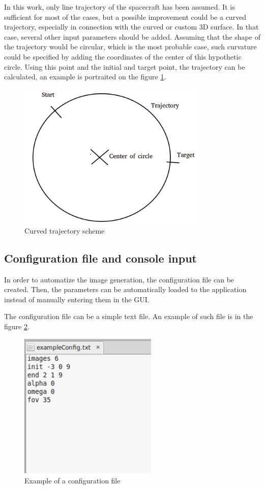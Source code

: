 \documentclass[english,12pt,a4paper,pdftex,elec,utf8]{aaltothesis}
\begin{document}
In this work, only line trajectory of the spacecraft has been assumed. It is sufficient for most of the cases, but a possible improvement could be a curved trajectory, especially in connection with the curved or custom 3D surface. In that case, several other input parameters should be added. Assuming that the shape of the trajectory would be circular, which is the most probable case, such curvature could be specified by adding the coordinates of the center of this hypothetic circle. Using this point and the initial and target point, the trajectory can be calculated, an example is portraited on the figure \ref{CurvedTrajectory}.

\begin{figure}[htb]
\centering \includegraphics[height=7cm]{CurvedTrajectory.png}
\caption{Curved trajectory scheme\label{CurvedTrajectory}}
\end{figure}

\subsection*{Configuration file and console input} 

In order to automatize the image generation, the configuration file can be created. Then, the parameters can be automatically loaded to the application instead of manually entering them in the GUI.

The configuration file can be a simple text file. An example of such file is in the figure \ref{exampleConfig}.

\begin{figure}[htb]
\centering \includegraphics[height=7cm]{exampleConfig.png}
\caption{Example of a configuration file\label{exampleConfig}}
\end{figure}
\end{document}
